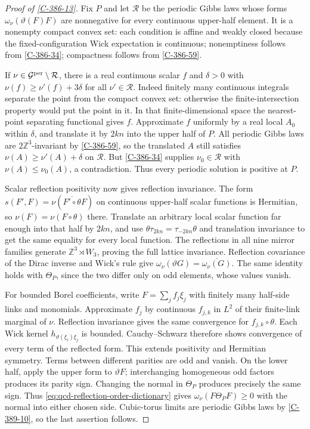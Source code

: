 \documentclass[11pt,letterpaper,reqno]{amsart}
\theoremstyle{definition}
\theoremstyle{remark}
\begin{document}
\begin{proof}[Proof of \cref{C-386-13}]
Fix $P$ and let $\mathcal R$ be the periodic Gibbs laws whose
forms $\omega_\nu(\vartheta(F)F)$ are nonnegative for every
continuous upper-half element. It is a nonempty compact convex
set: each condition is affine and weakly closed because the
fixed-configuration Wick expectation is continuous; nonemptiness
follows from \cref{C-386-34}; compactness follows from
\cref{C-386-59}.

If $\nu\in\mathcal G^{\rm per}\setminus\mathcal R$, there is
a real continuous scalar $f$ and $\delta>0$ with
$\nu(f)\ge\nu'(f)+3\delta$ for all $\nu'\in\mathcal R$.
Indeed finitely many continuous integrals separate the point
from the compact convex set: otherwise the finite-intersection
property would put the point in it. In that finite-dimensional
space the nearest-point separating functional gives $f$.
Approximate $f$ uniformly by a real local $A_0$ within
$\delta$, and translate it by $2kn$ into the upper half of
$P$. All periodic Gibbs laws are $2\mathbb Z^3$-invariant by
\cref{C-386-59}, so the translated $A$ still satisfies
$\nu(A)\ge\nu'(A)+\delta$ on $\mathcal R$.
But \cref{C-386-34} supplies $\nu_0\in\mathcal R$ with
$\nu(A)\le\nu_0(A)$, a contradiction. Thus every periodic
solution is positive at $P$.

Scalar reflection positivity now gives reflection invariance.
The form $s(F',F)=\nu(\overline{F'\circ\theta}F)$ on
continuous upper-half scalar functions is Hermitian, so
$\nu(F)=\nu(F\circ\theta)$ there. Translate an arbitrary
local scalar function far enough into that half by $2kn$,
and use $\theta\tau_{2kn}=\tau_{-2kn}\theta$ and translation
invariance to get the same equality for every local function.
The reflections in all nine mirror families generate
$\mathbb Z^3\rtimes W_3$, proving the full lattice invariance.
Reflection covariance of the Dirac inverse and Wick's rule give
$\omega_\nu(\vartheta G)=\overline{\omega_\nu(G)}$.
The same identity holds with $\Theta_P$, since the two differ
only on odd elements, whose values vanish.

For bounded Borel coefficients, write $F=\sum_jf_j\xi_j$
with finitely many half-side links and monomials. Approximate
$f_j$ by continuous $f_{j,k}$ in $L^2$ of their finite-link
marginal of $\nu$. Reflection invariance gives the same
convergence for $f_{j,k}\circ\theta$. Each Wick kernel
$h_{\vartheta(\xi_i)\xi_j}$ is bounded. Cauchy--Schwarz
therefore shows convergence of every term of the reflected
form. This extends positivity and Hermitian symmetry. Terms
between different parities are odd and vanish.
On the lower half, apply the upper form to $\vartheta F$;
interchanging homogeneous odd factors produces its parity sign.
Changing the normal in $\Theta_P$ produces precisely the same
sign. Thus \eqref{eq:qcd-reflection-order-dictionary} gives
$\omega_\nu(F\Theta_PF)\ge0$ with the normal into either
chosen side. Cubic-torus limits are periodic Gibbs laws by
\cref{C-389-10}, so the last assertion follows.
\end{proof}
\end{document}
